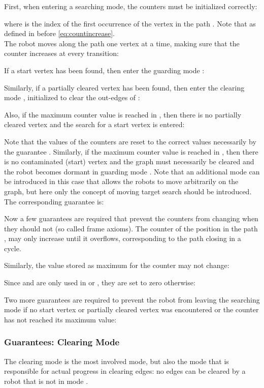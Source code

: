 First, when entering a searching mode, the counters must be initialized correctly:

where  is the index of the first occurrence of the vertex  in the path . Note that  as defined in  before \eqref{eq:countincrease}.\\

The robot moves along the path  one vertex at a time, making sure that the counter  increases at every transition:


If a start vertex has been found, then enter the guarding mode :

Similarly, if a partially cleared vertex  has been found, then enter the clearing mode , initialized to clear the out-edges of :

Also, if the maximum counter value is reached in , then there is no partially cleared vertex and the search for a start vertex  is entered:

Note that the values of the counters are reset to the correct values necessarily by the guarantee . Similarly, if the maximum counter value is reached in , then there is no contaminated (start) vertex and the graph must necessarily be cleared and the robot becomes dormant in guarding mode . Note that an additional mode can be introduced in this case that allows the robots to move arbitrarily on the graph, but here only the concept of moving target search should be introduced. The corresponding guarantee is:


Now a few guarantees are required that prevent the counters from changing when they should not (so called frame axioms). The counter of the position in the path ,  may only increase until it overflows, corresponding to the path closing in a cycle.

Similarly, the value stored as maximum for the counter may not change:

Since  and  are only used in  or , they are set to zero otherwise:


Two more guarantees are required to prevent the robot from leaving the searching mode if no start vertex or partially cleared vertex was encountered or the counter has not reached its maximum value:



\subsubsection{Guarantees: Clearing Mode}

The clearing mode is the most involved mode, but also the mode that is responsible for actual progress in clearing edges: no edges can be cleared by a robot that is not in mode .\\

